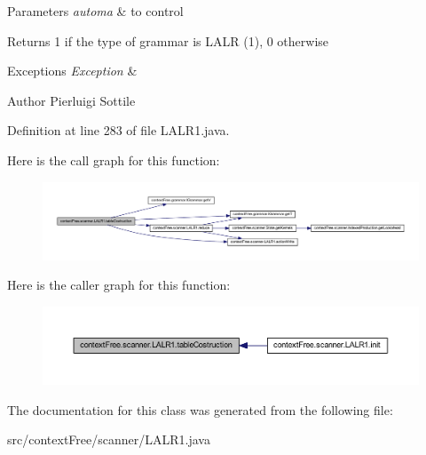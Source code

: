\begin{DoxyParams}{Parameters}
{\em automa} & to control \\
\hline
\end{DoxyParams}
\begin{DoxyReturn}{Returns}
1 if the type of grammar is L\-A\-L\-R (1), 0 otherwise 
\end{DoxyReturn}

\begin{DoxyExceptions}{Exceptions}
{\em Exception} & \\
\hline
\end{DoxyExceptions}
\begin{DoxyAuthor}{Author}
Pierluigi Sottile 
\end{DoxyAuthor}


Definition at line 283 of file L\-A\-L\-R1.\-java.



Here is the call graph for this function\-:\nopagebreak
\begin{figure}[H]
\begin{center}
\leavevmode
\includegraphics[width=350pt]{classcontext_free_1_1scanner_1_1_l_a_l_r1_a92b63b5d61bbdd523a16aa5e577c2ba6_cgraph}
\end{center}
\end{figure}




Here is the caller graph for this function\-:\nopagebreak
\begin{figure}[H]
\begin{center}
\leavevmode
\includegraphics[width=350pt]{classcontext_free_1_1scanner_1_1_l_a_l_r1_a92b63b5d61bbdd523a16aa5e577c2ba6_icgraph}
\end{center}
\end{figure}




The documentation for this class was generated from the following file\-:\begin{DoxyCompactItemize}
\item 
src/context\-Free/scanner/L\-A\-L\-R1.\-java\end{DoxyCompactItemize}
